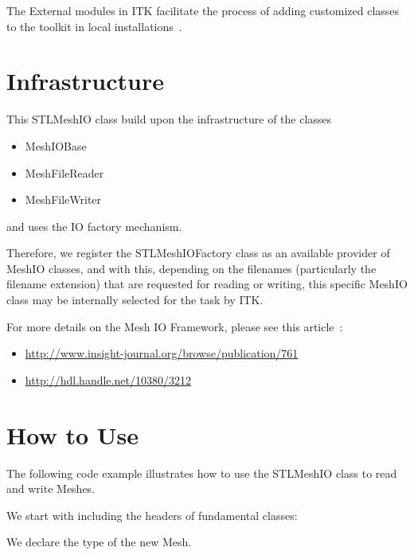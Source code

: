 \documentclass{InsightArticle}
\begin{document}
The External modules in ITK facilitate the process of adding customized classes
to the toolkit in local installations~\cite{Liu2013}.

\section{Infrastructure}

This STLMeshIO class build upon the infrastructure of the classes

\begin{itemize}
\item MeshIOBase
\item MeshFileReader
\item MeshFileWriter
\end{itemize}

and uses the IO factory mechanism.

Therefore, we register the STLMeshIOFactory class as an available provider of
MeshIO classes, and with this, depending on the filenames (particularly the
filename extension) that are requested for reading or writing, this specific
MeshIO class may be internally selected for the task by ITK.

For more details on the Mesh IO Framework, please see this
article~\cite{Zhu2010}:

\begin{itemize}
\item \url{http://www.insight-journal.org/browse/publication/761}
\item \url{http://hdl.handle.net/10380/3212}
\end{itemize}


\section{How to Use}

The following code example illustrates how to use the STLMeshIO class to read and write Meshes.

We start with including the headers of fundamental classes:

\begin{center}
\lstset{firstnumber=19}

\end{center}


We declare the type of the new Mesh.

\begin{center}
\lstset{firstnumber=35}

\end{center}
\end{document}
